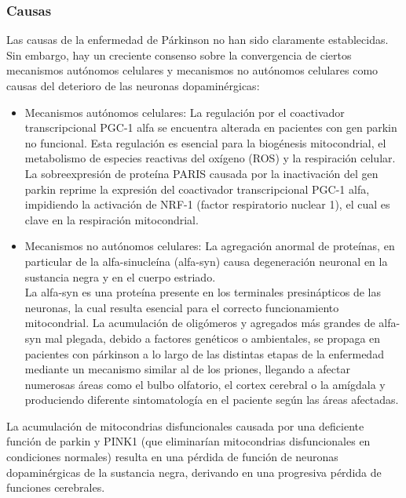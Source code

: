 \subsubsection{Causas}
Las causas de la enfermedad de Párkinson no han sido claramente establecidas. Sin embargo, hay un creciente consenso sobre la convergencia de ciertos mecanismos autónomos celulares y mecanismos no autónomos celulares como causas del deterioro de las neuronas dopaminérgicas\cite{hirsch2013pathogenesis}:
\begin{itemize}
    \item Mecanismos autónomos celulares: La regulación por el coactivador transcripcional PGC-1 alfa se encuentra alterada en pacientes con gen parkin no funcional. Esta regulación es esencial para la biogénesis mitocondrial, el metabolismo de especies reactivas del oxígeno (ROS) y la respiración celular.\\
    La sobreexpresión de proteína PARIS causada por la inactivación del gen parkin  reprime la expresión del coactivador transcripcional PGC-1 alfa, impidiendo la activación de NRF-1 (factor respiratorio nuclear 1), el cual es clave en la respiración mitocondrial. \cite{SHIN2011689}
    \item Mecanismos no autónomos celulares: La agregación anormal de proteínas, en particular de la  alfa-sinucleína (alfa-syn) causa degeneración neuronal en la sustancia negra y en el cuerpo estriado. \\
    La alfa-syn es una proteína presente en los terminales presinápticos de las neuronas, la cual resulta esencial para el correcto funcionamiento mitocondrial.  La acumulación de oligómeros y agregados más grandes de alfa-syn mal plegada, debido a factores genéticos o ambientales, se propaga en pacientes con párkinson a lo largo de las distintas etapas de la enfermedad mediante un mecanismo similar al de los priones, llegando a afectar numerosas áreas como el bulbo olfatorio, el cortex cerebral o la amígdala y produciendo diferente sintomatología en el paciente según las áreas afectadas. \cite{10.3389/fnins.2019.00552}
\end{itemize}
La acumulación de mitocondrias disfuncionales causada por una deficiente función de parkin y PINK1 (que eliminarían mitocondrias disfuncionales en condiciones normales) resulta en una pérdida de función de neuronas dopaminérgicas de la sustancia negra, derivando en una progresiva pérdida de funciones cerebrales. \cite{hirsch2013pathogenesis}
